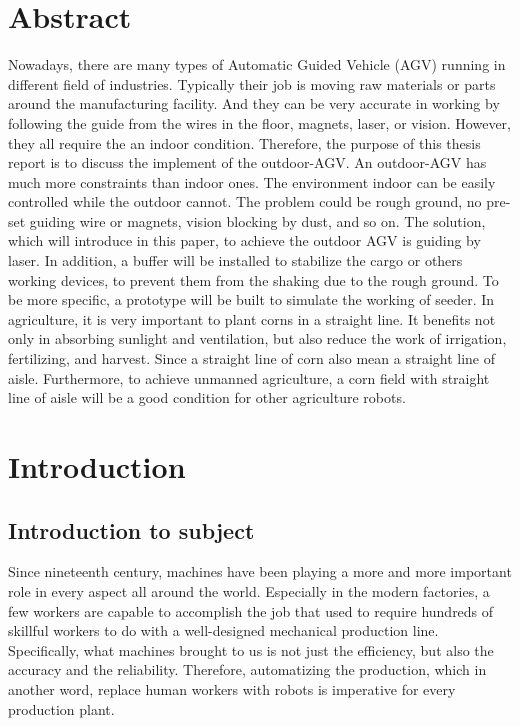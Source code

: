 \documentclass[letterpaper,12pt,oneside]{book}
\begin{document}
		
		
	\chapter*{Abstract}
		Nowadays, there are many types of Automatic Guided Vehicle (AGV) running in different field of industries. Typically their job is moving raw materials or parts around the manufacturing facility. And they can be very accurate in working by following the guide from the wires in the floor, magnets, laser, or vision. However, they all require the an indoor condition. Therefore, the purpose of this thesis report is to discuss the implement of the outdoor-AGV. An outdoor-AGV has much more constraints than indoor ones. The environment indoor can be easily controlled while the outdoor cannot. The problem could be rough ground, no pre-set guiding wire or magnets, vision blocking by dust, and so on. The solution, which will introduce in this paper, to achieve the outdoor AGV is guiding by laser. In addition, a buffer will be installed to stabilize the cargo or others working devices, to prevent them from the shaking due to the rough ground. To be more specific, a prototype will be built to simulate the working of seeder. In agriculture, it is very important to plant corns in a straight line. It benefits not only in absorbing sunlight and ventilation, but also reduce the work of irrigation, fertilizing, and harvest. Since a straight line of corn also mean a straight line of aisle. Furthermore, to achieve unmanned agriculture, a corn field with straight line of aisle will be a good condition for other agriculture robots. 
	 

	\mainmatter
	\setcounter{secnumdepth}{3}
		\chapter{Introduction}
		\section{Introduction to subject}
		
		Since nineteenth century, machines have been playing a more and more important role in every aspect all around the world. Especially in the modern factories, a few workers are capable to accomplish the job that used to require hundreds of skillful workers to do with a well-designed mechanical production line. 
		Specifically, what machines brought to us is not just the efficiency, but also the accuracy and the reliability. Therefore, automatizing the production, which in another word, replace human workers with robots is imperative for every production plant. 
		
\end{document}
